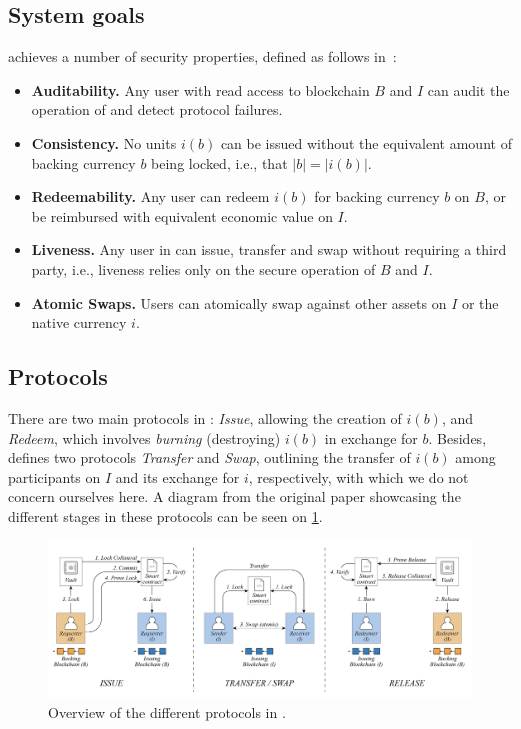\subsection{System goals}
\label{sec:xclaim_goals}

\xclaim achieves a number of security properties, defined as follows in~\cite[Section III-E]{zamyatin2019xclaim}:
\begin{itemize}
    \item \textbf{Auditability.} Any user with read access to blockchain $B$ and $I$ can audit the operation of \xclaim and detect protocol failures.
    \item \textbf{Consistency.} No \cba units $i(b)$ can be issued without the equivalent amount of backing currency $b$ being locked, i.e., that $|b| = |i(b)|$.
    \item \textbf{Redeemability.} Any user can redeem \cbas $i(b)$ for backing currency $b$ on $B$, or be reimbursed with equivalent economic value on $I$.
    \item \textbf{Liveness.} Any user in \xclaim can issue, transfer and swap \cbas without requiring a third party, i.e., liveness relies only on the secure operation of $B$ and $I$.
    \item \textbf{Atomic Swaps.} Users can atomically swap \xclaim \cbas against other assets on $I$ or the native currency $i$.
\end{itemize}

\subsection{Protocols}

There are two main protocols in \xclaim: \emph{Issue}, allowing the creation of $i(b)$, and \emph{Redeem}, which involves \emph{burning} (destroying) $i(b)$ in exchange for $b$.
Besides, \xclaim defines two protocols \emph{Transfer} and \emph{Swap}, outlining the transfer of $i(b)$ among participants on $I$ and its exchange for $i$, respectively, with which we do not concern ourselves here.
A diagram from the original \xclaim paper showcasing the different stages in these protocols can be seen on \cref{fig:xclaim_protocol}.

\begin{figure}
\centering
\includegraphics[width=1.0\textwidth]{img/xclaim.png}
\caption{Overview of the different protocols in \xclaim.}
\label{fig:xclaim_protocol}
\end{figure}

